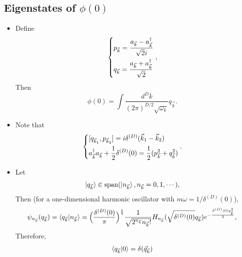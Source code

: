\documentclass[10pt, a4paper]{article}
\numberwithin{equation}{section}
\begin{document}
	\subsection{Eigenstates of \texorpdfstring{$\phi(0)$}{phi(0)}}
	\begin{itemize}
		\item Define
		\begin{equation}
			\begin{dcases}
				p_{\vec{k}} = \frac{a_{\vec{k}} - a^\dag_{\vec{k}}}{\sqrt{2} i} \\
				q_{\vec{k}} = \frac{a_{\vec{k}} + a^\dag_{\vec{k}} }{\sqrt{2}}
			\end{dcases},
		\end{equation}
		Then
		\begin{equation}
			\phi(0) = \int \frac{d^D k}{(2 \pi)^{D / 2} \sqrt{\omega_k}} q_{\vec{k}}.
		\end{equation}
		
		\item Note that
		\begin{equation}
			\begin{dcases}
				[q_{\vec{k}_1}, p_{\vec{k}_2}] = i \delta^{(D)}(\vec{k}_1 - \vec{k}_2) \\
				a^\dag_{\vec{k}} a_{\vec{k}} + \frac{1}{2} \delta^{(D)}(0) = \frac{1}{2} (p^2_{\vec{k}} + q^2_{\vec{k}})
			\end{dcases}.
		\end{equation}
		
		\item Let
		\begin{equation}
			\ket{q_{\vec{k}}} \in \mathrm{span}(\ket{n_{\vec{k}}}, n_{\vec{k}} = 0, 1, \cdots),
		\end{equation}
		Then (for a one-dimensional harmonic oscillator with $m \omega = 1 / \delta^{(D)}(0)$),
		\begin{equation}
			\psi_{n_{\vec{k}}}(q_{\vec{k}}) = \braket{q_{\vec{k}} | n_{\vec{k}}} = \Big( \frac{\delta^{(D)}(0)}{\pi} \Big)^{\frac{1}{4}} \frac{1}{\sqrt{2^{n_{\vec{k}}} n_{\vec{k}}!}} H_{n_{\vec{k}}}(\sqrt{\delta^{(D)}(0)} q_{\vec{k}}) e^{- \frac{\delta^{(D)}(0) q_{\vec{k}}^2}{2}},
		\end{equation}
		Therefore,
		\begin{equation}
			\braket{q_{\vec{k}} | 0} = \delta(\vec{q}_{\vec{k}})
		\end{equation}
	\end{itemize}
	
\end{document}
